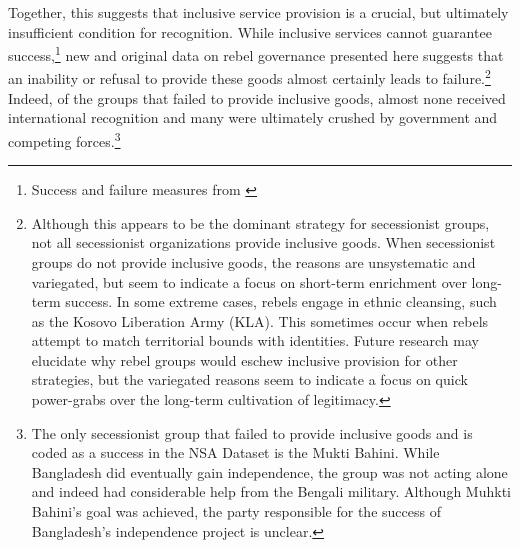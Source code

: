 \documentclass[12pt, letterpaper]{article}
\begin{document}
Together, this suggests that inclusive service provision is a crucial, but ultimately insufficient condition for recognition. While inclusive services cannot guarantee success,\footnote{Success and failure measures from \citet{cunningham2009takes}} new and original data on rebel governance presented here suggests that an inability or refusal to provide these goods almost certainly leads to failure.\footnote{Although this appears to be the dominant strategy for secessionist groups, not all secessionist organizations provide inclusive goods. When secessionist groups do not provide inclusive goods, the reasons are unsystematic and variegated, but seem to indicate a focus on short-term enrichment over long-term success. In some extreme cases, rebels engage in ethnic cleansing, such as the Kosovo Liberation Army (KLA). This sometimes occur when rebels attempt to match territorial bounds with identities. Future research may elucidate why rebel groups would eschew inclusive provision for other strategies, but the variegated reasons seem to indicate a focus on quick power-grabs over the long-term cultivation of legitimacy.} Indeed, of the groups that failed to provide inclusive goods, almost none received international recognition and many were ultimately crushed by government and competing forces.\footnote{The only secessionist group that failed to provide inclusive goods and is coded as a success in the NSA Dataset is the Mukti Bahini. While Bangladesh did eventually gain independence, the group was not acting alone and indeed had considerable help from the Bengali military. Although Muhkti Bahini's goal was achieved, the party responsible for the success of Bangladesh's independence project is unclear.} 

\end{document}
